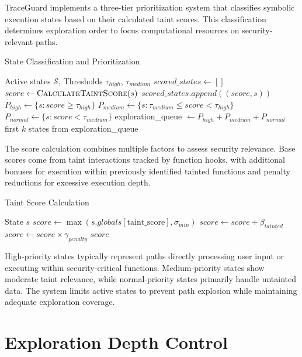 TraceGuard implements a three-tier prioritization system that classifies symbolic execution states based on their calculated taint scores. This classification determines exploration order to focus computational resources on security-relevant paths.

\begin{algorithm}
\caption{State Classification and Prioritization}
\begin{algorithmic}[1]
\Require Active states $\mathcal{S}$, Thresholds $\tau_{high}$, $\tau_{medium}$
\State $scored\_states \gets []$
    \State $score \gets \textsc{CalculateTaintScore}(s)$
    \State $scored\_states.append((score, s))$
\EndFor
\State $P_{high} \gets \{s : score \geq \tau_{high}\}$
\State $P_{medium} \gets \{s : \tau_{medium} \leq score < \tau_{high}\}$ 
\State $P_{normal} \gets \{s : score < \tau_{medium}\}$
\State exploration\_queue $\gets P_{high} + P_{medium} + P_{normal}$
\State \Return first $k$ states from exploration\_queue
\end{algorithmic}
\end{algorithm}

The score calculation combines multiple factors to assess security relevance. Base scores come from taint interactions tracked by function hooks, with additional bonuses for execution within previously identified tainted functions and penalty reductions for excessive execution depth.

\begin{algorithm}
\caption{Taint Score Calculation}
\begin{algorithmic}[1]
\Require State $s$
\State $score \gets \max(s.globals[\text{taint\_score}], \sigma_{min})$
    \State $score \gets score + \beta_{tainted}$
\EndIf
{}
    \State $score \gets score \times \gamma_{penalty}$
\EndIf
\State \Return $score$
\end{algorithmic}
\end{algorithm}

High-priority states typically represent paths directly processing user input or executing within security-critical functions. Medium-priority states show moderate taint relevance, while normal-priority states primarily handle untainted data. The system limits active states to prevent path explosion while maintaining adequate exploration coverage.

\section{Exploration Depth Control}

